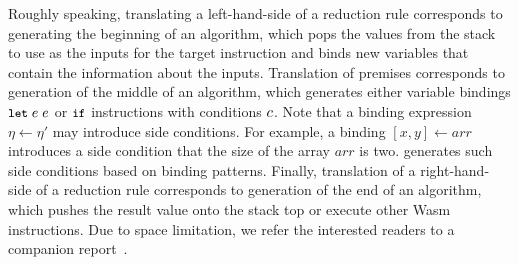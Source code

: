 Roughly speaking, translating a left-hand-side of a reduction rule corresponds to
generating the beginning of an algorithm, which pops the values from the stack
to use as the inputs for the target instruction and binds new variables
that contain the information about the inputs.
Translation of premises corresponds to generation of the middle of an algorithm,
which generates either variable bindings $\texttt{\small let} \; e \; e$
or $\texttt{\small if}$ instructions with conditions $c$.
Note that a binding expression $\eta \leftarrow \eta'$ may introduce side conditions.
For example, a binding $[x, y] \leftarrow \mathit{arr}$ introduces a side condition
that the size of the array $\mathit{arr}$ is two.
\dltoil generates such side conditions based on binding patterns.
Finally, translation of a right-hand-side of a reduction rule corresponds to
generation of the end of an algorithm, which pushes the result value onto the stack top
or execute other Wasm instructions.
Due to space limitation, we refer the interested readers to a companion report~\cite{il-tr}.

